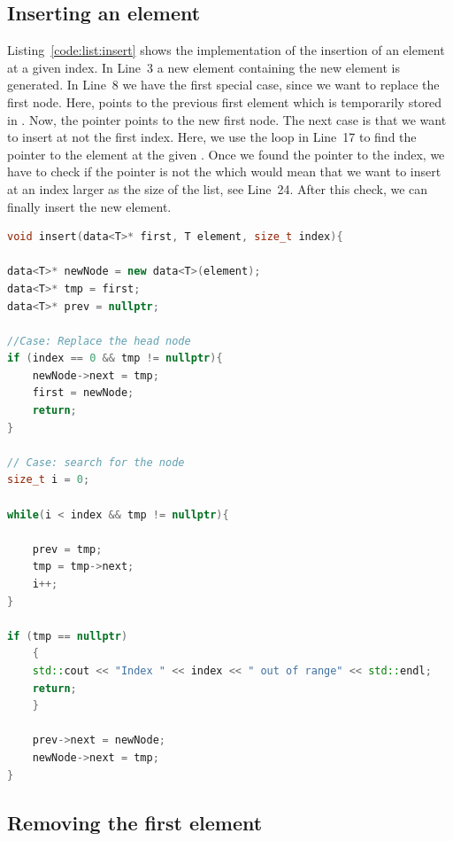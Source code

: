 \documentclass[11pt,fleqn]{book} %
\begin{document}
\subsection*{Inserting an element}
Listing~\ref{code:list:insert} shows the implementation of the insertion of an element at a given index. In Line~3 a new element  containing the new element is generated. In Line~8 we have the first special case, since we want to replace the first node. Here,  points to the previous first element which is temporarily stored in . Now, the pointer  points to the new first node. The next case is that we want to insert at not the first index. Here, we use the  loop in Line~17 to find the pointer to the element at the given . Once we found the pointer to the index, we have to check if the pointer is not the  which would mean that we want to insert at an index larger as the size of the list, see Line~24. After this check, we can finally insert the new element.

\begin{lstlisting}[language=c++,caption={Implementation of the \cpp{insert} function of a linked list.\label{code:list:insert}},float,floatplacement=tb]
void insert(data<T>* first, T element, size_t index){

data<T>* newNode = new data<T>(element);
data<T>* tmp = first;
data<T>* prev = nullptr;

//Case: Replace the head node
if (index == 0 && tmp != nullptr){
    newNode->next = tmp;
    first = newNode;
    return;
}

// Case: search for the node
size_t i = 0;

while(i < index && tmp != nullptr){

    prev = tmp;
    tmp = tmp->next;
    i++;
}

if (tmp == nullptr)
    {
    std::cout << "Index " << index << " out of range" << std::endl;
    return;
    }
    
    prev->next = newNode;    
    newNode->next = tmp;
}
\end{lstlisting}


\subsection*{Removing the first element}
\end{document}
